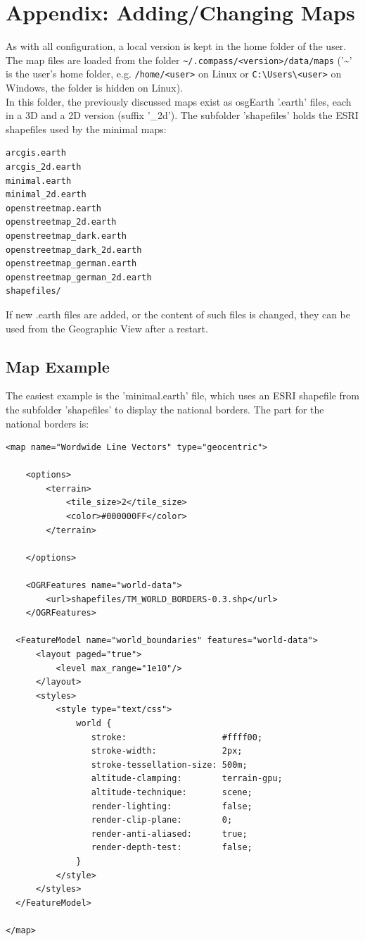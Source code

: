 \section{Appendix: Adding/Changing Maps}
\label{sec:appendix_maps}

As with all configuration, a local version is kept in the home folder of the user. The map files are loaded from the folder \texttt{\textasciitilde/.compass/<version>/data/maps} ('\textasciitilde' is the user's home folder, e.g. \texttt{/home/<user>} on Linux or \texttt{C:\textbackslash Users\textbackslash <user>} on Windows, the folder is hidden on Linux). \\

In this folder, the previously discussed maps exist as osgEarth '.earth' files, each in a 3D and a 2D version (suffix '\_2d'). The subfolder 'shapefiles' holds the ESRI shapefiles used by the minimal maps:

\begin{lstlisting}
arcgis.earth
arcgis_2d.earth
minimal.earth
minimal_2d.earth
openstreetmap.earth
openstreetmap_2d.earth
openstreetmap_dark.earth
openstreetmap_dark_2d.earth
openstreetmap_german.earth
openstreetmap_german_2d.earth
shapefiles/
\end{lstlisting}

If new .earth files are added, or the content of such files is changed, they can be used from the Geographic View after a restart.

\subsection{Map Example}
The easiest example is the 'minimal.earth' file, which uses an ESRI shapefile from the subfolder 'shapefiles' to display the national borders. The part for the national borders is:

\begin{lstlisting}
<map name="Wordwide Line Vectors" type="geocentric">

    <options>
        <terrain>
            <tile_size>2</tile_size>
            <color>#000000FF</color>
        </terrain>

    </options>

    <OGRFeatures name="world-data">
        <url>shapefiles/TM_WORLD_BORDERS-0.3.shp</url>
    </OGRFeatures>

  <FeatureModel name="world_boundaries" features="world-data">
      <layout paged="true">
          <level max_range="1e10"/>
      </layout>
      <styles>
          <style type="text/css">
              world {
                 stroke:                   #ffff00;
                 stroke-width:             2px;
                 stroke-tessellation-size: 500m;
                 altitude-clamping:        terrain-gpu;
                 altitude-technique:       scene;
                 render-lighting:          false;
                 render-clip-plane:        0;
                 render-anti-aliased:      true;
                 render-depth-test:        false;
              }
          </style>
      </styles>
  </FeatureModel>

</map>
\end{lstlisting}

